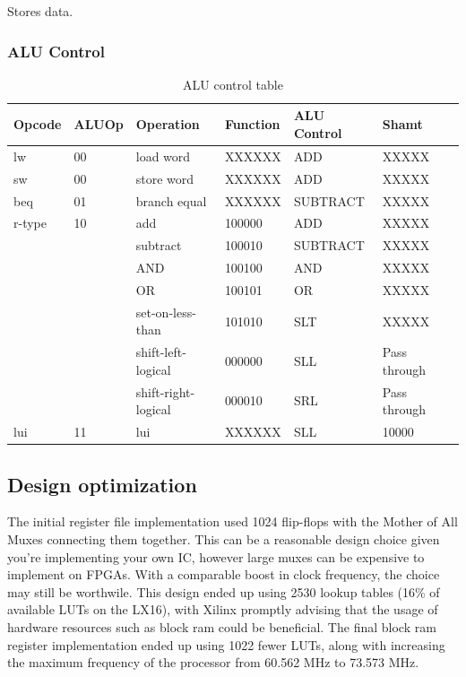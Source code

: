 Stores data.

\subsubsection{ALU Control}

\begin{table}[ht!]
    \begin{tabular}{|l|l|l|l|l|l|l|}
    \hline
    Opcode & ALUOp & Operation           & Function & ALU Control & Shamt   \\ \hline
    lw     & 00    & load word           & XXXXXX   & ADD         & XXXXX \\ \hline
    sw     & 00    & store word          & XXXXXX   & ADD         & XXXXX \\ \hline
    beq    & 01    & branch equal        & XXXXXX   & SUBTRACT    & XXXXX \\ \hline
    r-type & 10    & add                 & 100000   & ADD         & XXXXX \\ \cline{3-6}
           &       & subtract            & 100010   & SUBTRACT    & XXXXX \\ \cline{3-6}
           &       & AND                 & 100100   & AND         & XXXXX \\ \cline{3-6}
           &       & OR                  & 100101   & OR          & XXXXX \\ \cline{3-6}
           &       & set-on-less-than    & 101010   & SLT         & XXXXX \\ \cline{3-6}
           &       & shift-left-logical  & 000000   & SLL         & Pass through \\ \cline{3-6}
           &       & shift-right-logical & 000010   & SRL         & Pass through \\ \hline
    lui    & 11    & lui                 & XXXXXX   & SLL         & 10000 \\ \hline
    \end{tabular}
    \caption{ALU control table}
    \label{tab:alu-control}
\end{table}

\subsection{Design optimization}

The initial register file implementation used 1024 flip-flops with the Mother of All Muxes connecting them together.
This can be a reasonable design choice given you're implementing your own IC, however large muxes can be expensive to implement on FPGAs.
With a comparable boost in clock frequency, the choice may still be worthwile.
This design ended up using 2530 lookup tables (16\% of available LUTs on the LX16), with Xilinx promptly advising that the usage of hardware resources such as block ram could be beneficial.
The final block ram register implementation ended up using 1022 fewer LUTs, along with increasing the maximum frequency of the processor from 60.562 MHz to 73.573 MHz.

